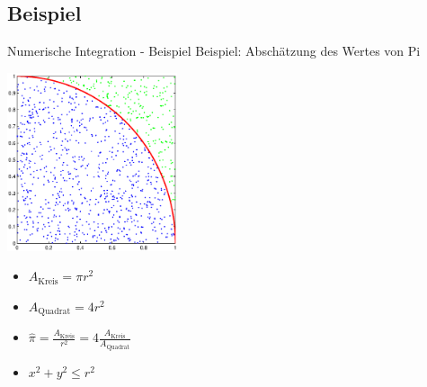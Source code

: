 \documentclass{beamer}
\begin{document}
\subsection{Beispiel}
\begin{frame}{Numerische Integration - Beispiel}
	Beispiel: Abschätzung des Wertes von Pi
	\begin{minipage}{5cm}
		\includegraphics[width=5cm]{images/kreis_hitmiss.eps}
	\end{minipage}
	\begin{minipage}{5cm}
		\begin{itemize}
		\item<1-> $A_{\text{Kreis}} = \pi r^{2}$
		\item<1-> $A_{\text{Quadrat}} = 4r^2$
		\item<1-> $\hat{\pi} = \frac{A_{\text{Kreis}}}{r^2} = 4 \frac{A_{\text{Kreis}}}{A_{\text{Quadrat}}}$
		\item<1-> $x^2 + y^2 \leq r^2$
		\end{itemize}
	\end{minipage}
\end{frame}
\end{document}
